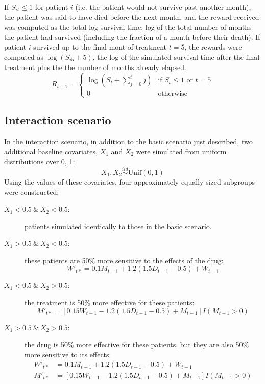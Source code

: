 \documentclass[12pt]{article}
\begin{document}
If $S_{it} \leq 1$ for patient $i$ (i.e. the patient would not survive past another month), the patient was said to have died before the next month, and the reward received was computed as the total log survival time: log of the total number of months the patient had survived (including the fraction of a month before their death). If patient $i$ survived up to the final mont of treatment $t = 5$, the rewards were computed as $\log(S_{i5} + 5)$, the log of the simulated survival time after the final treatment plus the the number of months already elapsed. 
\begin{equation}
  R_{t + 1} = \begin{cases}
    \log(S_{t} + \sum_{j = 0}^{t} j) & \text{if } S_{t} \leq 1 \text{ or } t = 5 \\
    0 & \text{otherwise}
  \end{cases}
\end{equation}



\subsection{Interaction scenario} %
\label{sub:subgroups_interaction}

In the interaction scenario, in addition to the basic scenario just described, two additional baseline covariates, $X_{1}$ and $X_{2}$ were simulated from uniform distributions over 0, 1:
\begin{equation}
  X_{1}, X_{2} \overset{iid}{\sim} \text{Unif}(0, 1) 
\end{equation}
Using the values of these covariates, four approximately equally sized subgroups were constructed:
\begin{description}
  \item [$X_{1} < 0.5 \ \& \ X_{2} < 0.5$:] patients simulated identically to those in the basic scenario.
  \item [$X_{1} > 0.5 \ \& \ X_{2} < 0.5$:] these patients are 50\% more sensitive to the effects of the drug:
   \begin{equation}
   W'_{t*} = 0.1 M_{t-1} + 1.2 (1.5 D_{t-1} - 0.5) + W_{t - 1}
   \end{equation}
   \item [$X_{1} < 0.5 \ \& \ X_{2} > 0.5$:] the treatment is 50\% more effective for these patients:
\begin{equation}
M'_{t*} = [0.15 W_{t-1} - 1.2 (1.5 D_{t-1} - 0.5) + M_{t - 1}] I(M_{t-1} > 0)
\end{equation}
   \item [$X_{1} > 0.5 \ \& \ X_{2} > 0.5$:] the drug is 50\% more effective for these patients, but they are also 50\% more sensitive to its effects:
   \begin{align}
   W'_{t*} &= 0.1 M_{t-1} + 1.2 (1.5 D_{t-1} - 0.5) + W_{t - 1} \\
   M'_{t*} &= [0.15 W_{t-1} - 1.2 (1.5 D_{t-1} - 0.5) + M_{t - 1}] I(M_{t-1} > 0)
   \end{align}
\end{description}
\end{document}

